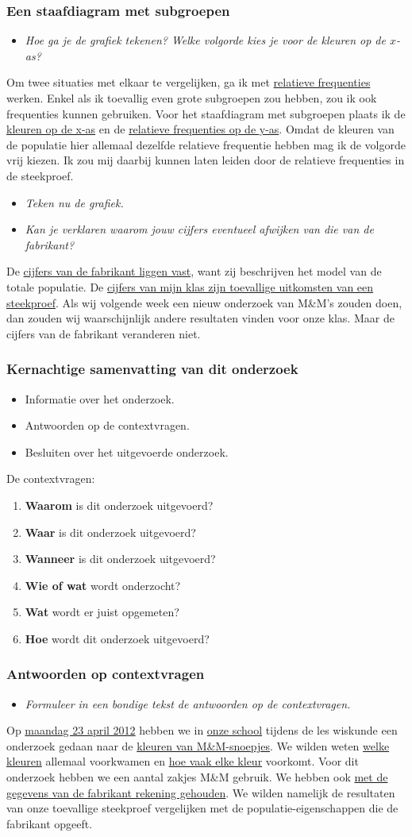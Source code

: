 \documentclass[dutch]{beamer}
\newcommand{\vraag}[1]{\begin{itemize}\item[Vraag:] {\it #1}\end{itemize}}
\begin{document}
\begin{frame}
\frametitle{Een staafdiagram met subgroepen}
\vraag{Hoe ga je de grafiek tekenen? Welke volgorde kies je voor de kleuren op de $x$-as?}
\pause
Om twee situaties met elkaar te vergelijken, ga ik met \uline{relatieve frequenties} werken. Enkel als
ik toevallig even grote subgroepen zou hebben, zou ik ook frequenties kunnen gebruiken.
Voor het staafdiagram met subgroepen plaats ik de \uline{kleuren op de x-as} en de \uline{relatieve
frequenties op de y-as}. Omdat de kleuren van de populatie hier allemaal dezelfde relatieve
frequentie hebben mag ik de volgorde vrij kiezen. Ik zou mij daarbij kunnen laten leiden door
de relatieve frequenties in de steekproef.
\pause
\vraag{Teken nu de grafiek.}
\pause
\vraag{Kan je verklaren waarom jouw cijfers eventueel afwijken van die van de fabrikant?}
\pause
De \uline{cijfers van de fabrikant liggen vast}, want zij beschrijven het model van de totale
populatie. De \uline{cijfers van mijn klas zijn toevallige uitkomsten van een steekproef}. Als wij
volgende week een nieuw onderzoek van M\&M’s zouden doen, dan zouden wij waarschijnlijk
andere resultaten vinden voor onze klas. Maar de cijfers van de fabrikant veranderen niet.
\end{frame}

\begin{frame}
\frametitle{Kernachtige samenvatting van dit onderzoek}
\begin{itemize}
  \item Informatie over het onderzoek.
  \item Antwoorden op de contextvragen.
  \item Besluiten over het uitgevoerde onderzoek.
\end{itemize}
\pause
De contextvragen:
\begin{enumerate}
  \item {\bf Waarom} is dit onderzoek uitgevoerd?
  \item {\bf Waar} is dit onderzoek uitgevoerd?
  \item {\bf Wanneer} is dit onderzoek uitgevoerd?
  \item {\bf Wie of wat} wordt onderzocht?
  \item {\bf Wat} wordt er juist opgemeten?
  \item {\bf Hoe} wordt dit onderzoek uitgevoerd?
\end{enumerate}
\end{frame}

\begin{frame}
\frametitle{Antwoorden op contextvragen}
\vraag{Formuleer in een bondige tekst de antwoorden op de contextvragen.}
\pause
Op \uline{maandag 23 april 2012} hebben we in \uline{onze school} tijdens de les wiskunde een
onderzoek gedaan naar de \uline{kleuren van M\&M-snoepjes}. We wilden weten \uline{welke kleuren}
allemaal voorkwamen en \uline{hoe vaak elke kleur} voorkomt. Voor dit onderzoek hebben we een
aantal zakjes M\&M gebruik. We hebben ook \uline{met de gegevens van de fabrikant rekening gehouden}.
We wilden namelijk de resultaten van onze toevallige steekproef vergelijken met de
populatie-eigenschappen die de fabrikant opgeeft.
\end{frame}
\end{document}

